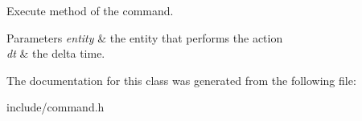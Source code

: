 Execute method of the command. 


\begin{DoxyParams}{Parameters}
{\em entity} & the entity that performs the action \\
\hline
{\em dt} & the delta time. \\
\hline
\end{DoxyParams}


The documentation for this class was generated from the following file\+:\begin{DoxyCompactItemize}
\item 
include/command.\+h\end{DoxyCompactItemize}
